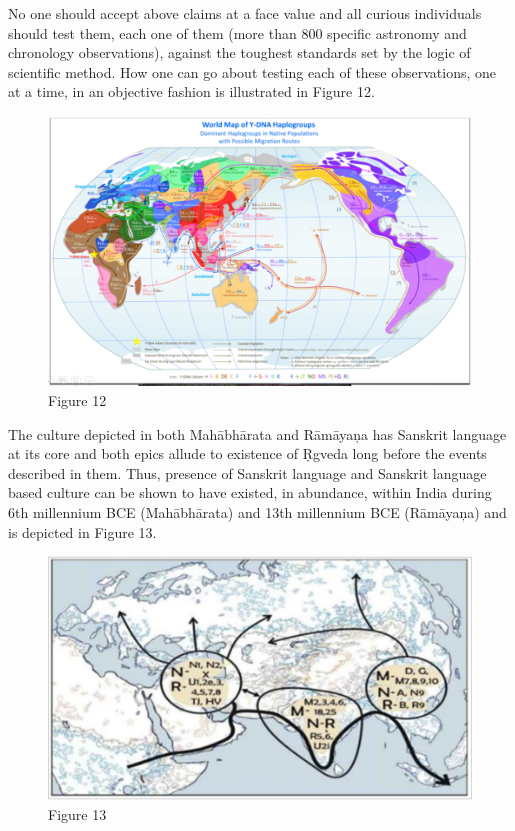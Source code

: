 No one should accept above claims at a face value and all curious individuals should test them, each one of them (more than 800 specific astronomy and chronology observations), against the toughest standards set by the logic of scientific method. How one can go about testing each of these observations, one at a time, in an objective fashion is illustrated in Figure 12.

\begin{figure}
\includegraphics{"images/8-12.jpg"}
\caption{Figure 12}
\end{figure}

The culture depicted in both Mahābhārata and Rāmāyaņa has Sanskrit language at its core and both epics allude to existence of Ṛgveda long before the events described in them. Thus, presence of Sanskrit language and Sanskrit language based culture can be shown to have existed, in abundance, within India during 6th millennium BCE (Mahābhārata) and 13th millennium BCE (Rāmāyaņa) and is depicted in Figure 13.

\begin{figure}
\includegraphics{"images/8-13.jpg"}
\caption{Figure 13}
\end{figure}


